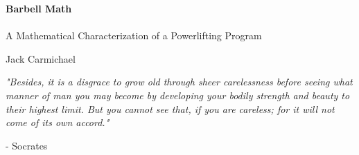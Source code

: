 \documentclass[footheight=20pt, footsepline, headheight=20pt, headsepline]{book}
\begin{document}

\begingroup
\thispagestyle{empty}
\centering
\vspace*{8cm}
\par\normalfont\fontsize{35}{35}\sffamily\selectfont
\textbf{Barbell Math}\\
\\
{\large A Mathematical Characterization of a Powerlifting Program}\par %
\vspace*{1cm}
{\Huge Jack Carmichael}\par %
\endgroup

\newpage
\thispagestyle{empty}

\vspace*{\fill}
\textit{"Besides, it is a disgrace to grow old through sheer carelessness before seeing what manner of man you may become by developing your bodily strength and beauty to their highest limit. But you cannot see that, if you are careless; for it will not come of its own accord."}\\
\begin{center}
    - Socrates
\end{center}
\vspace*{\fill}
\newpage
\tableofcontents
\newpage




%
%
%

%

\printbibliography[heading=bibintoc,title={References}]
\end{document}
